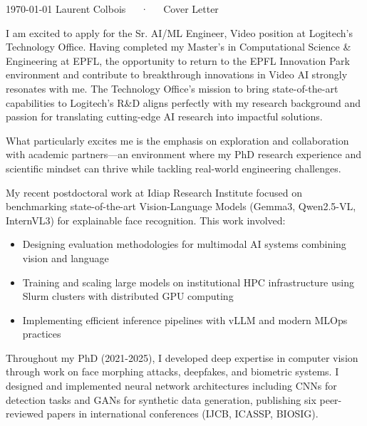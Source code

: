 \documentclass[11pt, a4paper]{awesome-cv}
\begin{document}
\makecvheader[C]

\makecvfooter
  {\today}
  {Laurent Colbois~~~·~~~Cover Letter}
  {}

\makelettertitle

\begin{cvletter}

I am excited to apply for the Sr. AI/ML Engineer, Video position at Logitech's Technology Office. Having completed my Master's in Computational Science \& Engineering at EPFL, the opportunity to return to the EPFL Innovation Park environment and contribute to breakthrough innovations in Video AI strongly resonates with me. The Technology Office's mission to bring state-of-the-art capabilities to Logitech's R\&D aligns perfectly with my research background and passion for translating cutting-edge AI research into impactful solutions.

What particularly excites me is the emphasis on exploration and collaboration with academic partners—an environment where my PhD research experience and scientific mindset can thrive while tackling real-world engineering challenges.

My recent postdoctoral work at Idiap Research Institute focused on benchmarking state-of-the-art Vision-Language Models (Gemma3, Qwen2.5-VL, InternVL3) for explainable face recognition. This work involved:
\begin{itemize}
  \item Designing evaluation methodologies for multimodal AI systems combining vision and language
  \item Training and scaling large models on institutional HPC infrastructure using Slurm clusters with distributed GPU computing
  \item Implementing efficient inference pipelines with vLLM and modern MLOps practices
\end{itemize}

Throughout my PhD (2021-2025), I developed deep expertise in computer vision through work on face morphing attacks, deepfakes, and biometric systems. I designed and implemented neural network architectures including CNNs for detection tasks and GANs for synthetic data generation, publishing six peer-reviewed papers in international conferences (IJCB, ICASSP, BIOSIG).


\end{cvletter}
\end{document}
